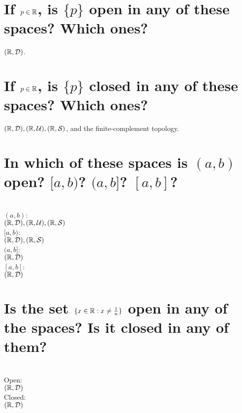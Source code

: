 \begin{parts}
 
 \part{If $p \in \mathbb{R}$, is $\{p\}$ open in any of these spaces? Which ones?}
 
 
\begin{solution}
 $(\mathbb{R}, \mathcal{D})$. 
\end{solution}

\part{If $p \in \mathbb{R}$, is $\{p\}$ closed in any of these spaces? Which ones?}

\begin{solution}
$(\mathbb{R}, \mathcal{D}), (\mathbb{R}, \mathcal{U}), (\mathbb{R}, \mathcal{S})$, and the finite-complement topology.
\end{solution}

\part{In which of these spaces is $(a,b)$ open? $[a,b)$? $(a,b]$? $[a,b]$?}

\begin{solution}
 \\$(a,b)$: \\
 $(\mathbb{R}, \mathcal{D}), (\mathbb{R}, \mathcal{U}), (\mathbb{R}, \mathcal{S})$ \\
 $[a,b)$: \\
 $(\mathbb{R}, \mathcal{D}), (\mathbb{R}, \mathcal{S})$ \\
 $(a,b]$: \\
 $(\mathbb{R}, \mathcal{D})$ \\
 $[a,b]$: \\
 $(\mathbb{R}, \mathcal{D})$ \\
\end{solution}

\part{Is the set $\{x \in \mathbb{R}: x \neq \frac{1}{n}\}$ open in any of the spaces? Is it closed in any of them?}

\begin{solution}
 \\Open: \\
 $(\mathbb{R}, \mathcal{D})$ \\
 Closed: \\
 $(\mathbb{R}, \mathcal{D})$ \\
\end{solution}


\end{parts}
